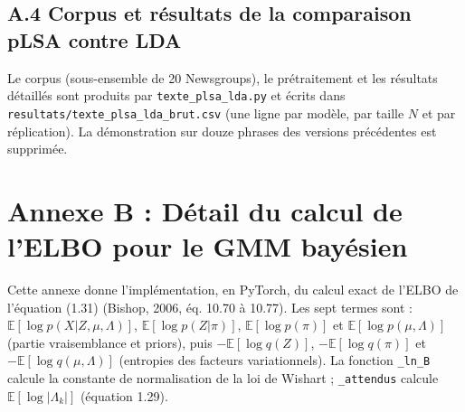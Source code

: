 \subsection*{A.4 Corpus et résultats de la comparaison pLSA contre LDA}
Le corpus (sous-ensemble de 20 Newsgroups), le prétraitement et les résultats détaillés sont produits par \texttt{texte\_plsa\_lda.py} et écrits dans \texttt{resultats/texte\_plsa\_lda\_brut.csv} (une ligne par modèle, par taille $N$ et par réplication). La démonstration sur douze phrases des versions précédentes est supprimée.


\section*{Annexe B : Détail du calcul de l'ELBO pour le GMM bayésien}
Cette annexe donne l'implémentation, en PyTorch, du calcul exact de l'ELBO de l'équation (1.31) (Bishop, 2006, éq. 10.70 à 10.77). Les sept termes sont : $\mathbb{E}[\log p(X|Z,\mu ,\Lambda )]$, $\mathbb{E}[\log p(Z|\pi )]$, $\mathbb{E}[\log p(\pi )]$ et $\mathbb{E}[\log p(\mu ,\Lambda )]$ (partie vraisemblance et priors), puis $-\mathbb{E}[\log q(Z)]$, $-\mathbb{E}[\log q(\pi )]$ et $-\mathbb{E}[\log q(\mu ,\Lambda )]$ (entropies des facteurs variationnels). La fonction \texttt{\_ln\_B} calcule la constante de normalisation de la loi de Wishart ; \texttt{\_attendus} calcule $\mathbb{E}[\log |\Lambda _{k}|]$ (équation 1.29).

